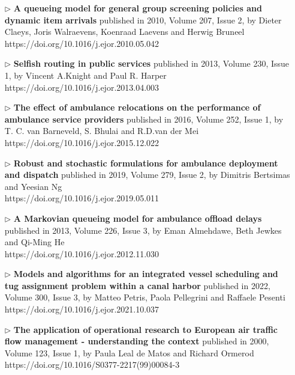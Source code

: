 \documentclass{article}
\begin{document}
    \begin{itemize}
        \item[$\rhd$] \textbf{A queueing model for general group screening
        policies and dynamic item arrivals} published in 2010, Volume 207,
        Issue 2, by Dieter Claeys, Joris Walraevens, Koenraad Laevens and
        Herwig Bruneel \\
        https://doi.org/10.1016/j.ejor.2010.05.042
        \item[$\rhd$] \textbf{Selfish routing in public services} published in
        2013, Volume 230, Issue 1, by Vincent A.Knight and Paul R. Harper \\
        https://doi.org/10.1016/j.ejor.2013.04.003
        \item[$\rhd$] \textbf{The effect of ambulance relocations on the
        performance of ambulance service providers} published in 2016, Volume
        252, Issue 1, by T. C. van Barneveld, S. Bhulai and R.D.van der Mei \\
        https://doi.org/10.1016/j.ejor.2015.12.022
        \item[$\rhd$] \textbf{Robust and stochastic formulations for ambulance
        deployment and dispatch} published in 2019, Volume 279, Issue 2, by
        Dimitris Bertsimas and Yeesian Ng \\
        https://doi.org/10.1016/j.ejor.2019.05.011
        \item[$\rhd$] \textbf{A Markovian queueing model for ambulance offload
        delays} published in 2013, Volume 226, Issue 3, by Eman Almehdawe, Beth
        Jewkes and Qi-Ming He \\
        https://doi.org/10.1016/j.ejor.2012.11.030
        \item[$\rhd$] \textbf{Models and algorithms for an integrated vessel
        scheduling and tug assignment problem within a canal harbor} published
        in 2022, Volume 300, Issue 3, by Matteo Petris, Paola Pellegrini and
        Raffaele Pesenti \\
        https://doi.org/10.1016/j.ejor.2021.10.037
        \item[$\rhd$] \textbf{The application of operational research to
        European air traffic flow management - understanding the context}
        published in 2000, Volume 123, Issue 1, by Paula Leal de Matos and
        Richard Ormerod \\
        https://doi.org/10.1016/S0377-2217(99)00084-3
    \end{itemize}
    
\end{document}

